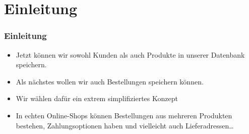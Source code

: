 \documentclass[aspectratio=169,mathserif,notheorems]{beamer}%
\subtitle{11.~Fabrik-Datenbank:~Tabelle \emph{demand}}%
\begin{document}
%
%
\startPresentation%
%
\section{Einleitung}%
%
\begin{frame}%
\frametitle{Einleitung}%
\begin{itemize}%
\item Jetzt können wir sowohl Kunden als auch Produkte in unserer Datenbank speichern.%
\item<2-> Als nächstes wollen wir auch Bestellungen speichern können.%
\item<3-> Wir wählen dafür ein extrem simplifiziertes Konzept%
\item<5-> In echten Online-Shops können Bestellungen aus mehreren Produkten bestehen, Zahlungsoptionen haben und vielleicht auch Lieferadressen\dots{}%
\end{itemize}%
\end{frame}%
%
%
\end{document}
